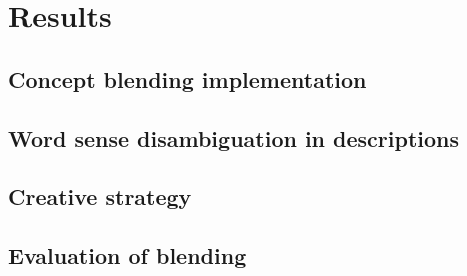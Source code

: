 
\chapter{Results} %

\label{Chapter5} %


\section{Concept blending implementation}


\section{Word sense disambiguation in descriptions}


\section{Creative strategy}


\section{Evaluation of blending}

